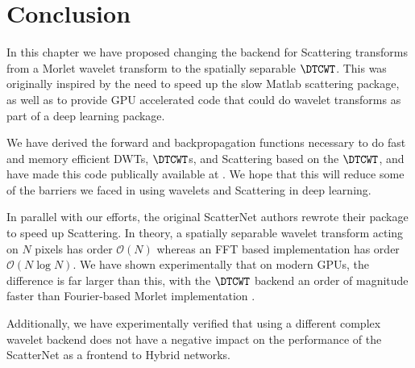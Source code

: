 \section{Conclusion}
In this chapter we have proposed changing the backend for Scattering transforms
from a Morlet wavelet transform to the spatially separable $\DTCWT$. This was
originally inspired by the need to speed up the slow Matlab scattering package,
as well as to provide GPU accelerated code that could do wavelet transforms as part
of a deep learning package.

We have derived the forward and backpropagation functions necessary to do 
fast and memory efficient DWTs, $\DTCWT$s, and Scattering based on the $\DTCWT$, 
and have made this code publically available at \cite{cotter_pytorch_2018}. We
hope that this will reduce some of the barriers we faced in using wavelets and
Scattering in deep learning.

In parallel with our efforts, the original ScatterNet authors rewrote their
package to speed up Scattering. In theory, a spatially separable wavelet
transform acting on $N$ pixels has order $\mathcal{O}(N)$ whereas an FFT based
implementation has order $\mathcal{O}(N \log N)$. We have shown experimentally
that on modern GPUs, the difference is far larger than this, with the $\DTCWT$
backend an order of magnitude faster than Fourier-based Morlet implementation
\cite{andreux_kymatio:_2018}.

Additionally, we have experimentally verified that using a different complex
wavelet backend does not have a negative impact on the performance of the
ScatterNet as a frontend to Hybrid networks. 
